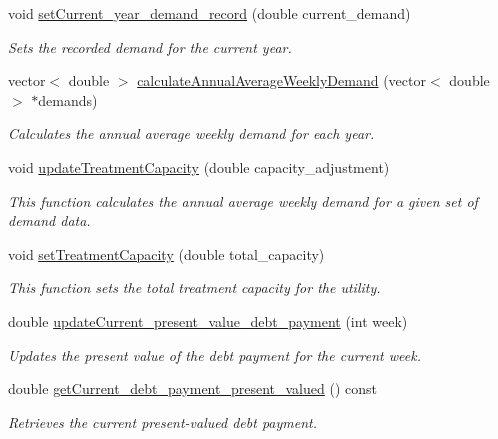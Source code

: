 \begin{DoxyCompactItemize}
void \mbox{\hyperlink{classUtility_a0a3190b991d667caf30a2e7cf447fae1}{set\+Current\+\_\+year\+\_\+demand\+\_\+record}} (double current\+\_\+demand)
\begin{DoxyCompactList}\small\item\em Sets the recorded demand for the current year. \end{DoxyCompactList}\item 
vector$<$ double $>$ \mbox{\hyperlink{classUtility_a5bae4fe8c3f0c782f0cdf5d14b7b92a7}{calculate\+Annual\+Average\+Weekly\+Demand}} (vector$<$ double $>$ $\ast$demands)
\begin{DoxyCompactList}\small\item\em Calculates the annual average weekly demand for each year. \end{DoxyCompactList}\item 
void \mbox{\hyperlink{classUtility_ae0134c9627b79067e1789c95c775570d}{update\+Treatment\+Capacity}} (double capacity\+\_\+adjustment)
\begin{DoxyCompactList}\small\item\em This function calculates the annual average weekly demand for a given set of demand data. \end{DoxyCompactList}\item 
void \mbox{\hyperlink{classUtility_ae2dd2175d9fe1d71ea1f1e8b43a21148}{set\+Treatment\+Capacity}} (double total\+\_\+capacity)
\begin{DoxyCompactList}\small\item\em This function sets the total treatment capacity for the utility. \end{DoxyCompactList}\item 
double \mbox{\hyperlink{classUtility_ab920387a318f7d7956da5e92582a58a3}{update\+Current\+\_\+present\+\_\+value\+\_\+debt\+\_\+payment}} (int week)
\begin{DoxyCompactList}\small\item\em Updates the present value of the debt payment for the current week. \end{DoxyCompactList}\item 
double \mbox{\hyperlink{classUtility_a407debda53abcf80ebd290414c1bf5bc}{get\+Current\+\_\+debt\+\_\+payment\+\_\+present\+\_\+valued}} () const
\begin{DoxyCompactList}\small\item\em Retrieves the current present-\/valued debt payment. \end{DoxyCompactList}\item 

\end{DoxyCompactItemize}
